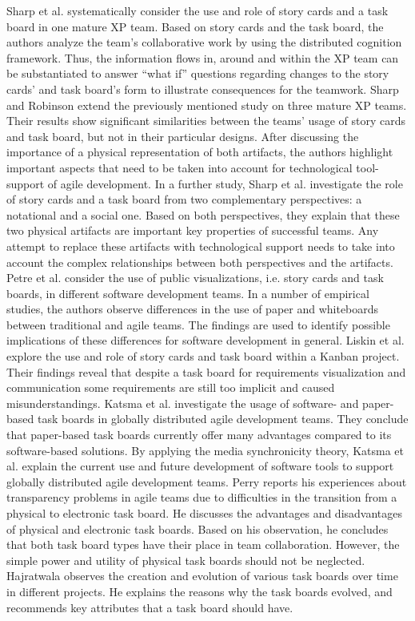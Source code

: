 \documentclass{llncs}
\begin{document}
Sharp et al. \cite{Sharp.2006} systematically consider the use and role of 
story cards and a task board in one mature XP team. Based on story cards and 
the task board, the authors analyze the team's collaborative work by using the 
distributed cognition framework. Thus, the information flows in, around and 
within the XP team can be substantiated to answer ``what if'' questions 
regarding changes to the story cards' and task board's form to illustrate 
consequences for the teamwork.
Sharp and Robinson \cite{Sharp.2008} extend the previously mentioned study on 
three mature XP teams. Their results show significant similarities between the 
teams' usage of story cards and task board, but not in their particular 
designs. After discussing the importance of a physical representation of both 
artifacts, the authors highlight important aspects that need to be taken into 
account for technological tool-support of agile development.
In a further study, Sharp et al. \cite{Sharp.2009} investigate the role of 
story cards and a task board from two complementary perspectives: a notational 
and a social one. Based on both perspectives, they explain that these two 
physical artifacts are important key properties of successful teams. Any 
attempt to replace these artifacts with technological support needs to take 
into account the complex relationships between both perspectives and the 
artifacts.
Petre et al. \cite{Petre.2012} consider the use of public visualizations, i.e. 
story cards and task boards, in different software development teams. In a 
number of empirical studies, the authors observe differences in the use of 
paper and whiteboards between traditional and agile teams. The findings are 
used to identify possible implications of these differences for software 
development in general.
Liskin et al. \cite{Liskin.2014} explore the use and role of story cards and 
task board within a Kanban project. Their findings reveal that despite a task 
board for requirements visualization and communication some requirements are 
still too implicit and caused misunderstandings.
Katsma et al. \cite{Katsma.2013} investigate the usage of software- and 
paper-based task boards in globally distributed agile development teams. They 
conclude that paper-based task boards currently offer many advantages compared 
to its software-based solutions. By applying the media synchronicity theory, 
Katsma et al. \cite{Katsma.2013} explain the current use and future development 
of software tools to support globally distributed agile development teams.
Perry \cite{Perry.2008} reports his experiences about transparency problems in 
agile teams due to difficulties in the transition from a physical to electronic 
task board. He discusses the advantages and disadvantages of physical and 
electronic task boards. Based on his observation, he concludes that both task 
board types have their place in team collaboration. However, the simple power 
and utility of physical task boards should not be neglected.
Hajratwala \cite{Hajratwala.2012} observes the creation and evolution of 
various task boards over time in different projects. He explains the reasons 
why the task boards evolved, and recommends key attributes that a task board 
should have.
\end{document}

